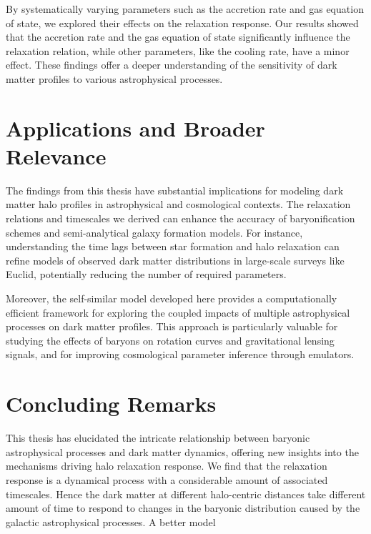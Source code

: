 By systematically varying parameters such as the accretion rate and gas equation of state, we explored their effects on the relaxation response. Our results showed that the accretion rate and the gas equation of state significantly influence the relaxation relation, while other parameters, like the cooling rate, have a minor effect. These findings offer a deeper understanding of the sensitivity of dark matter profiles to various astrophysical processes.

\section*{Applications and Broader Relevance}
The findings from this thesis have substantial implications for modeling dark matter halo profiles in astrophysical and cosmological contexts. The relaxation relations and timescales we derived can enhance the accuracy of baryonification schemes and semi-analytical galaxy formation models. For instance, understanding the time lags between star formation and halo relaxation can refine models of observed dark matter distributions in large-scale surveys like Euclid, potentially reducing the number of required parameters.

Moreover, the self-similar model developed here provides a computationally efficient framework for exploring the coupled impacts of multiple astrophysical processes on dark matter profiles. This approach is particularly valuable for studying the effects of baryons on rotation curves and gravitational lensing signals, and for improving cosmological parameter inference through emulators.



\section*{Concluding Remarks}
This thesis has elucidated the intricate relationship between baryonic astrophysical processes and dark matter dynamics, offering new insights into the mechanisms driving halo relaxation response. We find that the relaxation response is a dynamical process with a considerable amount of associated timescales. Hence the dark matter at different halo-centric distances take different amount of time to respond to changes in the baryonic distribution caused by the galactic astrophysical processes. A better model 

